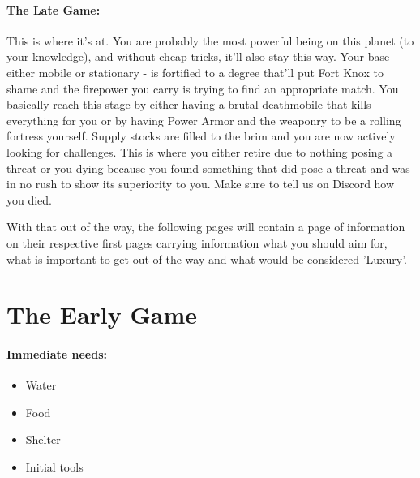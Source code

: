 \paragraph{The Late Game:}
This is where it's at. You are probably the most powerful being on this planet (to your knowledge), and without cheap tricks, it'll also stay this way. Your base - either mobile or stationary - is fortified to a degree that'll put Fort Knox to shame and the firepower you carry is trying to find an appropriate match. You basically reach this stage by either having a brutal deathmobile that kills everything for you or by having Power Armor and the weaponry to be a rolling fortress yourself. Supply stocks are filled to the brim and you are now actively looking for challenges. This is where you either retire due to nothing posing a threat or you dying because you found something that did pose a threat and was in no rush to show its superiority to you. Make sure to tell us on Discord how you died.

With that out of the way, the following pages will contain a page of information on their respective first pages carrying information what you should aim for, what is important to get out of the way and what would be considered 'Luxury'.

\section{The Early Game}

\paragraph{Immediate needs:}
\begin{itemize}
\item Water
\item Food
\item Shelter
\item Initial tools
\end{itemize}

